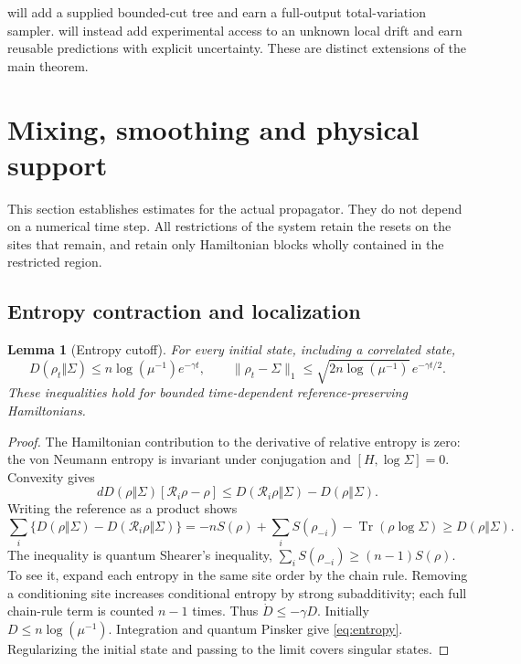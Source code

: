 \documentclass[11pt,reqno]{amsart}
\numberwithin{equation}{section}
\newtheorem{lemma}[theorem]{Lemma}
\theoremstyle{definition}
\theoremstyle{remark}
\newcommand{\Tr}{\operatorname{Tr}}
\newcommand{\nn}[1]{\lVert#1\rVert}
\newcommand{\reset}{\mathcal R}
\begin{document}
 will add a supplied bounded-cut tree and earn a full-output total-variation sampler.  will instead add experimental access to an unknown local drift and earn reusable predictions with explicit uncertainty. These are distinct extensions of the main theorem.


\section{Mixing, smoothing and physical support}\label{sec:analytic}

This section establishes estimates for the actual propagator. They do not depend on a numerical time step. All restrictions of the system retain the resets on the sites that remain, and retain only Hamiltonian blocks wholly contained in the restricted region.

\subsection{Entropy contraction and localization}
\begin{lemma}[Entropy cutoff]\label{lem:entropy}
For every initial state, including a correlated state,
\begin{equation}\label{eq:entropy}
 D(\rho_t\Vert\Sigma)\leq n\log(\mu^{-1})e^{-\gamma t},\qquad
 \nn{\rho_t-\Sigma}_1\leq\sqrt{2n\log(\mu^{-1})}\,e^{-\gamma t/2}.
\end{equation}
These inequalities hold for bounded time-dependent reference-preserving Hamiltonians.
\end{lemma}
\begin{proof}
The Hamiltonian contribution to the derivative of relative entropy is zero: the von Neumann entropy is invariant under conjugation and $[H,\log\Sigma]=0$. Convexity gives
\[
 dD(\rho\Vert\Sigma)[\reset_i\rho-\rho]
 \leq D(\reset_i\rho\Vert\Sigma)-D(\rho\Vert\Sigma).
\]
Writing the reference as a product shows
\[
 \sum_i\{D(\rho\Vert\Sigma)-D(\reset_i\rho\Vert\Sigma)\}
 =-nS(\rho)+\sum_iS(\rho_{-i})-\Tr(\rho\log\Sigma)
 \geq D(\rho\Vert\Sigma).
\]
The inequality is quantum Shearer's inequality, $\sum_iS(\rho_{-i})\geq(n-1)S(\rho)$. To see it, expand each entropy in the same site order by the chain rule. Removing a conditioning site increases conditional entropy by strong subadditivity; each full chain-rule term is counted $n-1$ times. Thus $\dot D\leq-\gamma D$. Initially $D\leq n\log(\mu^{-1})$. Integration and quantum Pinsker give \eqref{eq:entropy}. Regularizing the initial state and passing to the limit covers singular states.
\end{proof}
\end{document}
